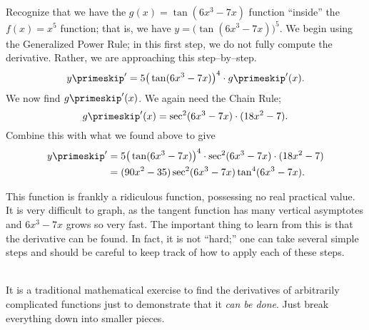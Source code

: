 {Recognize that we have the $g(x)=\tan(6x^3-7x)$ function ``inside'' the $f(x)=x^5$ function; that is, we have $y = \big(\tan(6x^3-7x)\big)^5$. We begin using the Generalized Power Rule; in this first step, we do not fully compute the derivative. Rather, we are approaching this step--by--step.
\[
y\primeskip' = 5\big(\tan(6x^3-7x)\big)^4\cdot g\primeskip'(x).
\]
We now find $g\primeskip'(x)$. We again need the Chain Rule; 
\[
g\primeskip'(x) = \sec^2(6x^3-7x)\cdot(18x^2-7).
\]
Combine this with what we found above to give
\begin{align*}
y\primeskip' &= 5\big(\tan(6x^3-7x)\big)^4\cdot\sec^2(6x^3-7x)\cdot(18x^2-7)\\ 
&= (90x^2-35)\sec^2(6x^3-7x)\tan^4(6x^3-7x).
\end{align*}

This function is frankly a ridiculous function, possessing no real practical value. It is very difficult to graph, as the tangent function has many vertical asymptotes and $6x^3-7x$ grows so very fast. The important thing to learn from this is that the derivative can be found. In fact, it is not ``hard;'' one can take several simple steps and should be careful to keep track of how to apply each of these steps.%
}\\

It is a traditional mathematical exercise to find the derivatives of arbitrarily complicated functions just to demonstrate that it \textit{can be done}. Just break everything down into smaller pieces. \\



